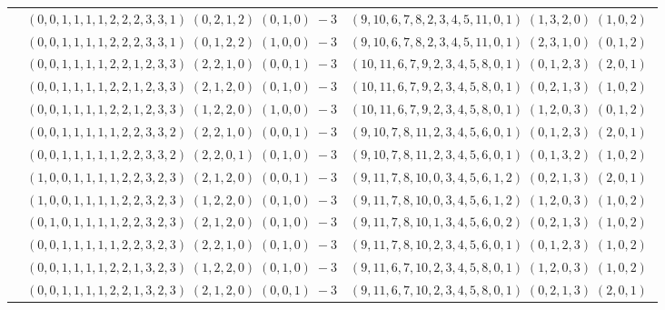 \documentclass[11pt]{article}
\begin{document}
\begin{longtable}[l]{|c|c|c|}
 \cline{2-3} 
 & $(0 ,0 ,1 ,1 ,1 ,1 ,2 ,2 ,2 ,3 ,3 ,1) \;(0 ,2 ,1 ,2) \;(0 ,1 ,0) \;-3$ & $(9 ,10 ,6 ,7 ,8 ,2 ,3 ,4 ,5 ,11 ,0 ,1) \;(1 ,3 ,2 ,0) \;(1 ,0 ,2) \;$\\ 
 \cline{2-3} 
 & $(0 ,0 ,1 ,1 ,1 ,1 ,2 ,2 ,2 ,3 ,3 ,1) \;(0 ,1 ,2 ,2) \;(1 ,0 ,0) \;-3$ & $(9 ,10 ,6 ,7 ,8 ,2 ,3 ,4 ,5 ,11 ,0 ,1) \;(2 ,3 ,1 ,0) \;(0 ,1 ,2) \;$\\ 
 \cline{2-3} 
 & $(0 ,0 ,1 ,1 ,1 ,1 ,2 ,2 ,1 ,2 ,3 ,3) \;(2 ,2 ,1 ,0) \;(0 ,0 ,1) \;-3$ & $(10 ,11 ,6 ,7 ,9 ,2 ,3 ,4 ,5 ,8 ,0 ,1) \;(0 ,1 ,2 ,3) \;(2 ,0 ,1) \;$\\ 
 \cline{2-3} 
 & $(0 ,0 ,1 ,1 ,1 ,1 ,2 ,2 ,1 ,2 ,3 ,3) \;(2 ,1 ,2 ,0) \;(0 ,1 ,0) \;-3$ & $(10 ,11 ,6 ,7 ,9 ,2 ,3 ,4 ,5 ,8 ,0 ,1) \;(0 ,2 ,1 ,3) \;(1 ,0 ,2) \;$\\ 
 \cline{2-3} 
 & $(0 ,0 ,1 ,1 ,1 ,1 ,2 ,2 ,1 ,2 ,3 ,3) \;(1 ,2 ,2 ,0) \;(1 ,0 ,0) \;-3$ & $(10 ,11 ,6 ,7 ,9 ,2 ,3 ,4 ,5 ,8 ,0 ,1) \;(1 ,2 ,0 ,3) \;(0 ,1 ,2) \;$\\ 
 \cline{2-3} 
 & $(0 ,0 ,1 ,1 ,1 ,1 ,1 ,2 ,2 ,3 ,3 ,2) \;(2 ,2 ,1 ,0) \;(0 ,0 ,1) \;-3$ & $(9 ,10 ,7 ,8 ,11 ,2 ,3 ,4 ,5 ,6 ,0 ,1) \;(0 ,1 ,2 ,3) \;(2 ,0 ,1) \;$\\ 
 \cline{2-3} 
 & $(0 ,0 ,1 ,1 ,1 ,1 ,1 ,2 ,2 ,3 ,3 ,2) \;(2 ,2 ,0 ,1) \;(0 ,1 ,0) \;-3$ & $(9 ,10 ,7 ,8 ,11 ,2 ,3 ,4 ,5 ,6 ,0 ,1) \;(0 ,1 ,3 ,2) \;(1 ,0 ,2) \;$\\ 
 \cline{2-3} 
 & $(1 ,0 ,0 ,1 ,1 ,1 ,1 ,2 ,2 ,3 ,2 ,3) \;(2 ,1 ,2 ,0) \;(0 ,0 ,1) \;-3$ & $(9 ,11 ,7 ,8 ,10 ,0 ,3 ,4 ,5 ,6 ,1 ,2) \;(0 ,2 ,1 ,3) \;(2 ,0 ,1) \;$\\ 
 \cline{2-3} 
 & $(1 ,0 ,0 ,1 ,1 ,1 ,1 ,2 ,2 ,3 ,2 ,3) \;(1 ,2 ,2 ,0) \;(0 ,1 ,0) \;-3$ & $(9 ,11 ,7 ,8 ,10 ,0 ,3 ,4 ,5 ,6 ,1 ,2) \;(1 ,2 ,0 ,3) \;(1 ,0 ,2) \;$\\ 
 \cline{2-3} 
 & $(0 ,1 ,0 ,1 ,1 ,1 ,1 ,2 ,2 ,3 ,2 ,3) \;(2 ,1 ,2 ,0) \;(0 ,1 ,0) \;-3$ & $(9 ,11 ,7 ,8 ,10 ,1 ,3 ,4 ,5 ,6 ,0 ,2) \;(0 ,2 ,1 ,3) \;(1 ,0 ,2) \;$\\ 
 \cline{2-3} 
 & $(0 ,0 ,1 ,1 ,1 ,1 ,1 ,2 ,2 ,3 ,2 ,3) \;(2 ,2 ,1 ,0) \;(0 ,1 ,0) \;-3$ & $(9 ,11 ,7 ,8 ,10 ,2 ,3 ,4 ,5 ,6 ,0 ,1) \;(0 ,1 ,2 ,3) \;(1 ,0 ,2) \;$\\ 
 \cline{2-3} 
 & $(0 ,0 ,1 ,1 ,1 ,1 ,2 ,2 ,1 ,3 ,2 ,3) \;(1 ,2 ,2 ,0) \;(0 ,1 ,0) \;-3$ & $(9 ,11 ,6 ,7 ,10 ,2 ,3 ,4 ,5 ,8 ,0 ,1) \;(1 ,2 ,0 ,3) \;(1 ,0 ,2) \;$\\ 
 \cline{2-3} 
 & $(0 ,0 ,1 ,1 ,1 ,1 ,2 ,2 ,1 ,3 ,2 ,3) \;(2 ,1 ,2 ,0) \;(0 ,0 ,1) \;-3$ & $(9 ,11 ,6 ,7 ,10 ,2 ,3 ,4 ,5 ,8 ,0 ,1) \;(0 ,2 ,1 ,3) \;(2 ,0 ,1) \;$\\ 

\end{longtable}
\end{document}
